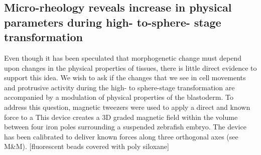 \subsection{Micro-rheology reveals increase in physical parameters during high- to-sphere- stage transformation}
Even though it has been speculated that morphogenetic change must depend upon changes in the physical properties of tissues, there is little direct evidence to support this idea.
We wish to ask if the changes that we see in cell movements and protrusive activity during the high- to sphere-stage transformation are accompanied by a modulation of physical properties of the blastoderm.
To address this question, magnetic tweezers were used to apply a direct and known force to a %
This device creates a 3D graded magnetic field within the volume between four iron poles surrounding a suspended zebrafish embryo.
The device has been calibrated to deliver known forces along three orthogonal axes (see M\&M).
[fluorescent beads covered with poly siloxane]

